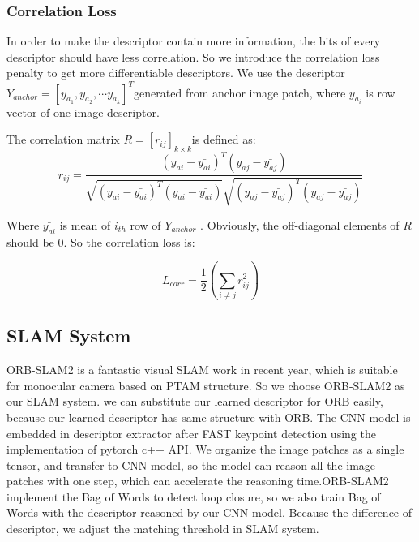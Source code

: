 \documentclass{svproc}
\begin{document}
\subsubsection{Correlation Loss} 
In order to make the descriptor contain more information, the bits of every descriptor should have less correlation\cite{c14}. So we introduce the correlation loss penalty to get more differentiable descriptors. We use the descriptor       $ Y_{anchor} = \left [ y_{a_1}, y_{a_2},\cdots y_{a_k}\right ]^{T} $generated from anchor image patch, where  $y_{a_i}$ is row vector of one image descriptor.

The correlation matrix $ R=[r_{ij}]_{k \times k} $is defined as:
\begin{equation}
r_{ij} = \frac{(y_{ai}-\bar{y_{ai}})^{T}(y_{aj}-\bar{y_{aj}})}{\sqrt{(y_{ai}-\bar{y_{ai}})^{T}(y_{ai}-\bar{y_{ai}})}\sqrt{(y_{aj}-\bar{y_{aj}})^{T}(y_{aj}-\bar{y_{aj}})}} 
\end{equation}

Where $ \bar{y_{ai}}$  is mean of $i_{th}$ row of $Y_{anchor}$ . Obviously, the off-diagonal elements of $R$ should be 0. So the correlation loss is:

\begin{equation}
L_{corr}=\frac{1}{2} \left(\sum\limits_{i \neq j} r_{ij}^2 \right)
\end{equation}

\subsection{SLAM System} 

ORB-SLAM2 is a fantastic visual SLAM work in recent year, which is suitable for monocular camera based on PTAM structure. So we choose ORB-SLAM2 as our SLAM system. we can substitute our learned descriptor for ORB easily, because our learned descriptor has same structure with ORB. The CNN model is embedded in descriptor extractor after FAST keypoint detection using the implementation of pytorch c++ API. We organize the image patches as a single tensor, and transfer to CNN model, so the model can reason all the image patches with one step, which can accelerate the reasoning time.ORB-SLAM2 implement the Bag of Words to detect loop closure, so we also train Bag of Words with the descriptor reasoned by our CNN model. Because the difference of descriptor, we adjust the matching threshold in SLAM system.

\end{document}
